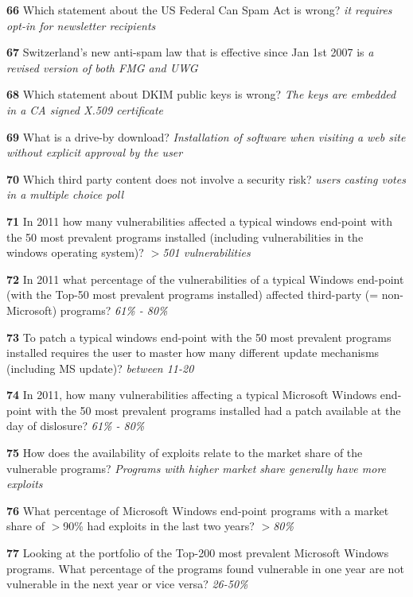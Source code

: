 \textbf{  66}  Which statement about the US Federal Can Spam Act is wrong?  
\textit{ it requires opt-in for newsletter recipients}

\textbf{  67}  Switzerland’s new anti-spam law that is effective since Jan 1st 2007 is  
\textit{ a revised version of both FMG and UWG}

\textbf{  68}  Which statement about DKIM public keys is wrong?  
\textit{ The keys are embedded in a CA signed X.509 certificate}

\textbf{  69}  What is a drive-by download?  
\textit{ Installation of software when visiting a web site without explicit approval by the user}

\textbf{  70}  Which third party content does not involve a security risk?  
\textit{ users casting votes in a multiple choice poll}

\textbf{  71}  In 2011 how many vulnerabilities affected a typical windows end-point with the 50 most prevalent programs installed (including vulnerabilities in the windows operating system)? 
\textit{ $>$501 vulnerabilities}

\textbf{  72}  In 2011 what percentage of the vulnerabilities of a typical Windows end-point (with the Top-50 most prevalent programs installed) affected third-party (= non-Microsoft) programs? 
\textit{ 61\% - 80\%}

\textbf{  73}  To patch a typical windows end-point with the 50 most prevalent programs installed requires the user to master how many different update mechanisms (including MS update)? 
\textit{ between 11-20}

\textbf{  74}  In 2011, how many vulnerabilities affecting a typical Microsoft Windows end-point with the 50 most prevalent programs installed had a patch available at the day of dislosure? 
\textit{ 61\% - 80\%}

\textbf{  75}  How does the availability of exploits relate to the market share of the vulnerable programs? 
\textit{ Programs with higher market share generally have more exploits}

\textbf{  76}  What percentage of Microsoft Windows end-point programs with a market share of $>$90\% had exploits in the last two years? 
\textit{ $>$80\%}

\textbf{  77}  Looking at the portfolio of the Top-200 most prevalent Microsoft Windows programs. What percentage of the programs found vulnerable in one year are not vulnerable in the next year or vice versa?  
\textit{ 26-50\%}

